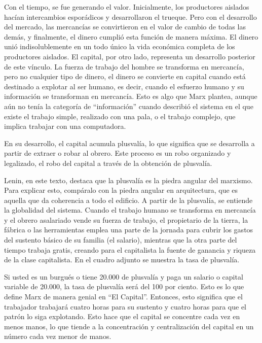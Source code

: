 \documentclass[
  jou,
  floatsintext,
  longtable,
  a4paper,
  nolmodern,
  notxfonts,
  notimes,
  colorlinks=true,linkcolor=blue,citecolor=blue,urlcolor=blue]{apa7}
\begin{document}
Con el tiempo, se fue generando el valor. Inicialmente, los productores
aislados hacían intercambios esporádicos y desarrollaron el trueque.
Pero con el desarrollo del mercado, las mercancías se convirtieron en el
valor de cambio de todas las demás, y finalmente, el dinero cumplió esta
función de manera máxima. El dinero unió indisolublemente en un todo
único la vida económica completa de los productores aislados. El
capital, por otro lado, representa un desarrollo posterior de este
vínculo. La fuerza de trabajo del hombre se transforma en mercancía,
pero no cualquier tipo de dinero, el dinero se convierte en capital
cuando está destinado a explotar al ser humano, es decir, cuando el
esfuerzo humano y su información se transforman en mercancía. Esto es
algo que Marx plantea, aunque aún no tenía la categoría de
``información'' cuando describió el sistema en el que existe el trabajo
simple, realizado con una pala, o el trabajo complejo, que implica
trabajar con una computadora.

En su desarrollo, el capital acumula plusvalía, lo que significa que se
desarrolla a partir de extraer o robar al obrero. Este proceso es un
robo organizado y legalizado, el robo del capital a través de la
obtención de plusvalía.

Lenin, en este texto, destaca que la plusvalía es la piedra angular del
marxismo. Para explicar esto, compáralo con la piedra angular en
arquitectura, que es aquella que da coherencia a todo el edificio. A
partir de la plusvalía, se entiende la globalidad del sistema. Cuando el
trabajo humano se transforma en mercancía y el obrero asalariado vende
su fuerza de trabajo, el propietario de la tierra, la fábrica o las
herramientas emplea una parte de la jornada para cubrir los gastos del
sustento básico de su familia (el salario), mientras que la otra parte
del tiempo trabaja gratis, creando para el capitalista la fuente de
ganancia y riqueza de la clase capitalista. En el cuadro adjunto se
muestra la tasa de plusvalía.

Si usted es un burgués o tiene 20.000 de plusvalía y paga un salario o
capital variable de 20.000, la tasa de plusvalía será del 100 por
ciento. Esto es lo que define Marx de manera genial en ``El Capital''.
Entonces, esto significa que el trabajador trabajará cuatro horas para
su sustento y cuatro horas para que el patrón lo siga explotando. Esto
hace que el capital se concentre cada vez en menos manos, lo que tiende
a la concentración y centralización del capital en un número cada vez
menor de manos.
\end{document}
